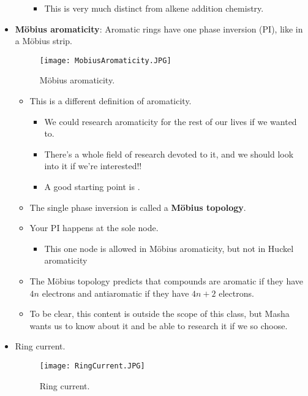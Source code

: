 \documentclass[../notes.tex]{subfiles}
\begin{document}
\begin{itemize}
\begin{itemize}
\begin{itemize}
            \item This is very much distinct from alkene addition chemistry.
        \end{itemize}
    \end{itemize}
    \item \textbf{M\"{o}bius aromaticity}: Aromatic rings have one phase inversion (PI), like in a M\"{o}bius strip.
    \begin{figure}[h!]
        \centering
        \texttt{[image: MobiusAromaticity.JPG]}
        \caption{M\"{o}bius aromaticity.}
        \label{fig:MobiusAromaticity}
    \end{figure}
    \begin{itemize}
        \item This is a different definition of aromaticity.
        \begin{itemize}
            \item We could research aromaticity for the rest of our lives if we wanted to.
            \item There's a whole field of research devoted to it, and we should look into it if we're interested!!
            \item A good starting point is \textcite{bib:MobAro}.
        \end{itemize}
        \item The single phase inversion is called a \textbf{M\"{o}bius topology}.
        \item Your PI happens at the sole node.
        \begin{itemize}
            \item This one node is allowed in M\"{o}bius aromaticity, but not in Huckel aromaticity
        \end{itemize}
        \item The M\"{o}bius topology predicts that compounds are aromatic if they have $4n$ electrons and antiaromatic if they have $4n+2$ electrons.
        \item To be clear, this content is outside the scope of this class, but Masha wants us to know about it and be able to research it if we so choose.
    \end{itemize}
    \item Ring current.
    \begin{figure}[h!]
        \centering
        \texttt{[image: RingCurrent.JPG]}
        \caption{Ring current.}
        \label{fig:ringCurrent}
    \end{figure}

\end{itemize}
\end{document}
